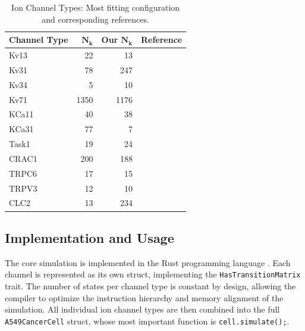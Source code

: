 \begin{table}
  \caption{Ion Channel Types: Most fitting configuration and corresponding references.}
  \begin{tabular}{lrrl}
    \textbf{Channel Type} & \textbf{$\bm{N_k}$ \cite{2021-A549-model}} & \textbf{Our $\bm{N_k}$} & \textbf{Reference} \\
    \midrule
    Kv13                  & 22                                         & 13                      & \cite{kv13-1}      \\
    Kv31                  & 78                                         & 247                     & \cite{kv31}        \\
    Kv34                  & 5                                          & 10                      & \cite{kv34}        \\
    Kv71                  & 1350                                       & 1176                    & \cite{kv71}        \\
    KCa11                 & 40                                         & 38                      & \cite{kca11}       \\
    KCa31                 & 77                                         & 7                       & \cite{kca31-2}     \\
    Task1                 & 19                                         & 24                      & \cite{task1}       \\
    CRAC1                 & 200                                        & 188                     & \cite{cracm1}      \\
    TRPC6                 & 17                                         & 15                      & \cite{trpc6}       \\
    TRPV3                 & 12                                         & 10                      & \cite{trpv3}       \\
    CLC2                  & 13                                         & 234                     & \cite{clc2}        \\
  \end{tabular}
  \label{table:channel-types}
\end{table}

\subsection{Implementation and Usage}
The core simulation is implemented in the Rust programming language \cite{2014-rust}.
Each channel is represented as its own struct, implementing the \texttt{HasTransitionMatrix} trait.
The number of states per channel type is constant by design, allowing the compiler to optimize the instruction hierarchy and memory alignment of the simulation.
All individual ion channel types are then combined into the full \texttt{A549CancerCell} struct, whose most important function is \texttt{cell.simulate();}.

